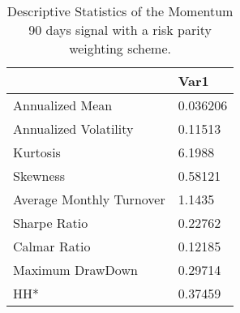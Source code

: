 \begin{table}[H]
\centering
\begin{tabular}{ll}
& Var1 \\ 
\hline 
Annualized Mean & 0.036206 \\ 
Annualized Volatility & 0.11513 \\ 
Kurtosis & 6.1988 \\ 
Skewness & 0.58121 \\ 
Average Monthly Turnover & 1.1435 \\ 
Sharpe Ratio & 0.22762 \\ 
Calmar Ratio & 0.12185 \\ 
Maximum DrawDown & 0.29714 \\ 
HH* & 0.37459 \\ 
\hline
\end{tabular}
\caption{Descriptive Statistics of the Momentum 90 days signal with a risk parity weighting scheme.}
\label{MOM90RP}
\end{table}